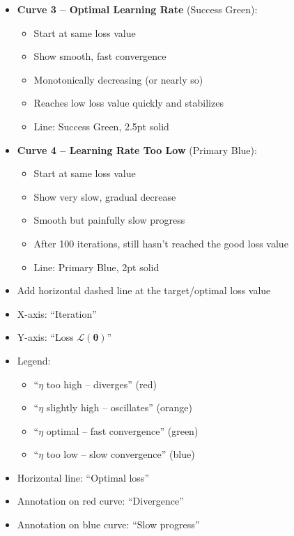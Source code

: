 \documentclass[12pt]{article}
\begin{document}
\begin{description}[style=nextline, leftmargin=0pt]
\begin{itemize}
        \item \textbf{Curve 3 -- Optimal Learning Rate} (Success Green):
        \begin{itemize}
            \item Start at same loss value
            \item Show smooth, fast convergence
            \item Monotonically decreasing (or nearly so)
            \item Reaches low loss value quickly and stabilizes
            \item Line: Success Green, 2.5pt solid
        \end{itemize}

        \item \textbf{Curve 4 -- Learning Rate Too Low} (Primary Blue):
        \begin{itemize}
            \item Start at same loss value
            \item Show very slow, gradual decrease
            \item Smooth but painfully slow progress
            \item After 100 iterations, still hasn't reached the good loss value
            \item Line: Primary Blue, 2pt solid
        \end{itemize}

        \item Add horizontal dashed line at the target/optimal loss value
    \end{itemize}

    \item[Required Labels]
    \begin{itemize}
        \item X-axis: ``Iteration''
        \item Y-axis: ``Loss $\mathcal{L}(\boldsymbol{\theta})$''
        \item Legend:
        \begin{itemize}
            \item ``$\eta$ too high -- diverges'' (red)
            \item ``$\eta$ slightly high -- oscillates'' (orange)
            \item ``$\eta$ optimal -- fast convergence'' (green)
            \item ``$\eta$ too low -- slow convergence'' (blue)
        \end{itemize}
        \item Horizontal line: ``Optimal loss''
        \item Annotation on red curve: ``Divergence''
        \item Annotation on blue curve: ``Slow progress''
    \end{itemize}


\end{description}
\end{document}
